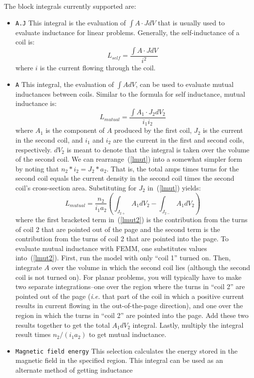 \documentclass[12pt]{report}
\newcommand{\be}{\begin{equation}}
\newcommand{\ee}{\end{equation}}
\begin{document}
The block integrals currently supported are:
\begin{itemize}
\item {\tt A.J}  This integral is the evaluation of $\int A \cdot J
dV$ that is usually used to evaluate inductance for linear problems.
Generally, the self-inductance of a coil is:
\be L_{self}= \frac{\int A \cdot J dV}{i^2} \ee
where $i$ is the current flowing through the coil.
\item {\tt A}  This integral, the evaluation of $\int A dV$, can be used to evaluate mutual
inductances between coils.  Similar to the formula for self
inductance, mutual inductance is:
\be \label{lmut} L_{mutual} = \frac{\int A_1 \cdot J_2 dV_2}{i_1 i_2} \ee
where $A_1$ is the component of $A$ produced by the first coil,
$J_2$ is the current in the second coil, and $i_1$ and $i_2$ are
the current in the first and second coils, respectively.  $dV_2$ is
meant to denote that the integral is taken over the volume of the
second coil.  We can rearrange~(\ref{lmut}) into a somewhat simpler
form by noting that $n_2 * i_2 = J_2 * a_2$.  That is, the total
amps times turns for the second coil equals the current density in
the second coil times the second coil's cross-section area.
Substituting for $J_2$ in~(\ref{lmut}) yields:
\be \label{lmut2}
L_{mutual} = \frac{n_2}{i_1 a_2} \left(\int_{J_{2+}} A_1 dV_2 -
\int_{J_{2-}} A_1 dV_2 \right)
\ee where the first bracketed term in~(\ref{lmut2}) is the contribution from
the turns of coil 2 that are pointed out of the page and the second
term is the contribution from the turns of coil 2 that are pointed
into the page.  To evaluate mutual inductance with FEMM, one
substitutes values into~(\ref{lmut2}). First, run the model with
only ``coil 1'' turned on. Then, integrate $A$ over the volume in
which the second coil lies (although the second coil is not turned
on). For planar problems, you will typically have to make two
separate integrations--one over the region where the turns in
``coil 2'' are pointed out of the page ({\em i.e.} that part of the
coil in which a positive current results in current flowing in the
out-of-the-page direction), and one over the region in which the
turns in ``coil 2'' are pointed into the page.  Add these two
results together to get the total $A_1 dV_2$ integral. Lastly,
multiply the integral result times $n_2/(i_1 a_2)$ to get mutual
inductance.
\item {\tt Magnetic field energy} This selection calculates the energy
stored in the magnetic field in the specified region.  This
integral can be used as an alternate method of getting inductance

\end{itemize}
\end{document}
